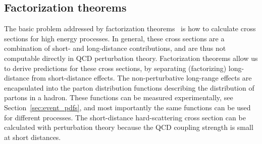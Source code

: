 \subsection{Factorization theorems}

The basic problem addressed by factorization theorems~\cite{Collins:1989gx} is how to calculate
cross sections for high energy processes. In general, these cross sections are a combination of
short- and long-distance contributions, and are thus not computable directly in QCD perturbation
theory.
Factorization theorems allow us to derive predictions for these cross sections,
by separating (factorizing) long-distance from short-distance effects. 
The non-perturbative long-range effects are encapsulated into the parton distribution functions
describing the distribution of partons in a hadron. 
These functions can be measured experimentally, see  Section~\ref{sec:event_pdfs}, and most
importantly the same functions can be used for different processes. 
The short-distance hard-scattering cross section can be calculated with perturbation theory
because the QCD coupling strength is small at short distances. 

